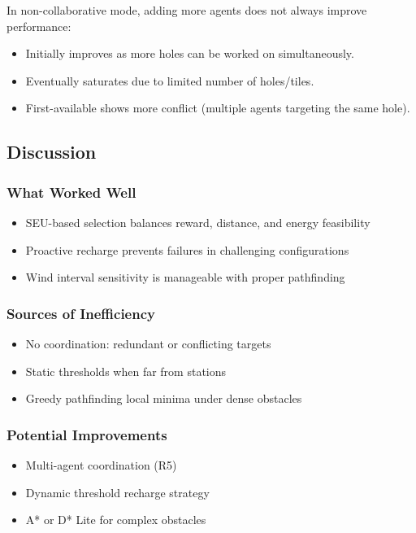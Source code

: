 In non-collaborative mode, adding more agents does not always improve performance:
\begin{itemize}
  \item Initially improves as more holes can be worked on simultaneously.
  \item Eventually saturates due to limited number of holes/tiles.
  \item First-available shows more conflict (multiple agents targeting the same hole).
\end{itemize}

\subsection{Discussion}

\subsubsection{What Worked Well}

\begin{itemize}
  \item SEU-based selection balances reward, distance, and energy feasibility
  \item Proactive recharge prevents failures in challenging configurations
  \item Wind interval sensitivity is manageable with proper pathfinding
\end{itemize}

\subsubsection{Sources of Inefficiency}

\begin{itemize}
  \item No coordination: redundant or conflicting targets
  \item Static thresholds when far from stations
  \item Greedy pathfinding local minima under dense obstacles
\end{itemize}

\subsubsection{Potential Improvements}

\begin{itemize}
  \item Multi-agent coordination (R5)
  \item Dynamic threshold recharge strategy
  \item A* or D* Lite for complex obstacles
\end{itemize}


